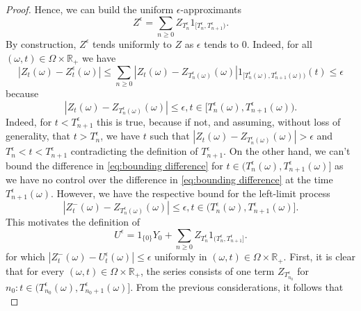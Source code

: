 \documentclass[11pt,a4paper,twoside,openany]{report}
\numberwithin{equation}{section}
\theoremstyle{plain} %
\theoremstyle{definition} %
\theoremstyle{remark} %
\begin{document}
\begin{proof}
    
 Hence, we can build the uniform \(\epsilon\)-approximants
    \begin{equation*}
        Z^{\epsilon}=\sum_{n\geq 0} Z_{T_n^{\epsilon}}1_{[T_{n}^{\epsilon},T_{n+1}^{\epsilon})}.
    \end{equation*}
 By construction, \(Z^{\epsilon}\) tends uniformly to \(Z\) as \(\epsilon\) tends to \(0\). Indeed, for all \((\omega,t)\in\Omega\times\mathbb{R}_+\) we have 
    \begin{equation*}
        |Z_t(\omega)-Z_t^{\epsilon}(\omega)|\leq\sum_{n\geq 0}|Z_{t}(\omega)-Z_{T_n^{\epsilon}(\omega)}(\omega)|1_{[T_{n}^{\epsilon}(\omega),T_{n+1}^{\epsilon}(\omega))}(t)\leq\epsilon
    \end{equation*}
    because 
    \begin{equation}\label{eq:bounding difference}
        |Z_{t}(\omega)-Z_{T_n^{\epsilon}(\omega)}(\omega)|\leq\epsilon, t\in[T_{n}^{\epsilon}(\omega),T_{n+1}^{\epsilon}(\omega)).
    \end{equation}
 Indeed, for \(t<T_{n+1}^{\epsilon}\) this is true, because if not, and assuming, without loss of generality, that \(t>T_{n}^{\epsilon}\), we have \(t\) such that \(|Z_{t}(\omega)-Z_{T_n^{\epsilon}(\omega)}(\omega)|>\epsilon\) and \(T_{n}^{\epsilon}<t<T_{n+1}^{\epsilon}\) contradicting the definition of \(T_{n+1}^{\epsilon}\). On the other hand, we can't bound the difference in \eqref{eq:bounding difference} for \(t\in (T_{n}^{\epsilon}(\omega),T_{n+1}^{\epsilon}(\omega)]\) as we have no control over the difference in \eqref{eq:bounding difference} at the time \(T_{n+1}^{\epsilon}(\omega)\). However, we have the respective bound for the left-limit process
 \begin{equation*}
       |Z_{t}^-(\omega)-Z_{T_n^{\epsilon}(\omega)}(\omega)|\leq\epsilon, t\in(T_{n}^{\epsilon}(\omega),T_{n+1}^{\epsilon}(\omega)].
 \end{equation*}
 This motivates the definition of 
 \begin{equation*}
        U^{\epsilon}=1_{\{0\}}Y_0+\sum_{n\geq 0} Z_{T_n^{\epsilon}}1_{(T_{n}^{\epsilon},T_{n+1}^{\epsilon}]}. 
    \end{equation*}
for which \(|Z_t^{-}(\omega)-U^{\epsilon}_t(\omega)|\leq\epsilon\)
uniformly in \((\omega,t)\in\Omega\times\mathbb{R}_+\).
First, it is clear that for every \((\omega,t)\in\Omega\times\mathbb{R}_+\), the series consists of one term \(Z_{T_{n_0}^\epsilon}\) for \(n_0:t\in(T_{n_0}^\epsilon(\omega),T_{n_0+1}^\epsilon(\omega)]\).
From the previous considerations, it follows that
\begin{equation*}

\end{equation*}
\end{proof}
\end{document}
